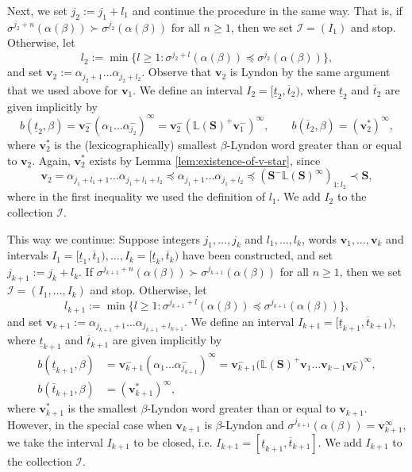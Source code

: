\documentclass[11pt]{amsart}
\theoremstyle{definition}
\theoremstyle{remark}
\numberwithin{equation}{section}
\renewcommand{\L}{\ensuremath{\mathbb{L}}}
\newcommand{\II}{\mathcal{I}}
\newcommand{\cs}{ {\mathbf{S}}}
\renewcommand{\v}{\mathbf{v}}
\newcommand{\f}{\infty}
\newcommand{\al}{\alpha}
\newcommand{\lle}{\preccurlyeq}
\newcommand{\lge}{\succcurlyeq}
\newcommand{\si}{\sigma}
\begin{document}
Next, we set $j_2:=j_1+l_1$ and continue the procedure in the same way. That is, if $\si^{j_2+n}(\al(\beta))\succ \si^{j_2}(\al(\beta))$ for all $n\geq 1$, then we set $\II=(I_1)$ and stop. Otherwise, let
\[
l_2:=\min\{l\geq 1: \si^{j_2+l}(\al(\beta))\lle \si^{j_2}(\al(\beta))\},
\]
and set $\v_2:=\al_{j_2+1}\dots\al_{j_2+l_2}$. Observe that $\v_2$ is Lyndon by the same argument that we used above for $\v_1$. We define an interval $I_2=[\underline{t}_2,\overline{t}_2)$, where $\underline{t}_2$ and $\overline{t}_2$ are given implicitly by
\[
b(\underline{t}_2,\beta)=\v_2^-(\al_1\dots\al_{j_2}^-)^\f=\v_2^-({\L(\cs)^+}\v_1^-)^\f, \qquad b(\overline{t}_2,\beta)=(\v_2^*)^\f,
\]
where $\v_2^*$ is the (lexicographically) smallest $\beta$-Lyndon word greater than or equal to $\v_2$. Again, $\v_2^*$ exists by Lemma \ref{lem:existence-of-v-star}, since
\[
\v_2=\al_{j_1+l_1+1}\dots\al_{j_1+l_1+l_2}\lle \al_{j_1+1}\dots\al_{j_1+l_2}\lle (\cs^-\L(\cs)^\f)_{1:l_2}\prec \cs,
\]
where in the first inequality we used the definition of $l_1$.
We add $I_2$ to the collection $\II$.

This way we continue: Suppose integers $j_1,\dots,j_k$ and $l_1,\dots,l_k$, words $\v_1,\dots,\v_k$ and intervals $I_1=[\underline{t}_1,\overline{t}_1),\dots,I_k=[\underline{t}_k,\overline{t}_k)$ have been constructed, and set $j_{k+1}:=j_k+l_k$. If $\si^{j_{k+1}+n}(\al(\beta))\succ \si^{j_{k+1}}(\al(\beta))$ for all $n\geq 1$, then we set $\II=(I_1,\dots,I_k)$ and stop. Otherwise, let
\[
l_{k+1}:=\min\{l\geq 1: \si^{j_{k+1}+l}(\al(\beta))\lle \si^{j_{k+1}}(\al(\beta))\},
\]
and set $\v_{k+1}:=\al_{j_{k+1}+1}\dots\al_{j_{k+1}+l_{k+1}}$. We define an interval $I_{k+1}=[\underline{t}_{k+1},\overline{t}_{k+1})$, where $\underline{t}_{k+1}$ and $\overline{t}_{k+1}$ are given implicitly by
\begin{align*}
b(\underline{t}_{k+1},\beta)&=\v_{k+1}^-(\al_1\dots\al_{j_{k+1}}^-)^\f=\v_{k+1}^-\big({\L(\cs)^+}\v_1\dots\v_{k-1}\v_k^-\big)^\f,\\
b(\overline{t}_{k+1},\beta)&=(\v_{k+1}^*)^\f,
\end{align*}
where $\v_{k+1}^*$ is the smallest $\beta$-Lyndon word greater than or equal to $\v_{k+1}$.
However, in the special case when $\v_{k+1}$ is $\beta$-Lyndon and $\si^{j_{k+1}}(\al(\beta))=\v_{k+1}^\f$, we take the interval $I_{k+1}$ to be closed, i.e. $I_{k+1}=[\underline{t}_{k+1},\overline{t}_{k+1}]$. We add $I_{k+1}$ to the collection $\II$.
\end{document}
